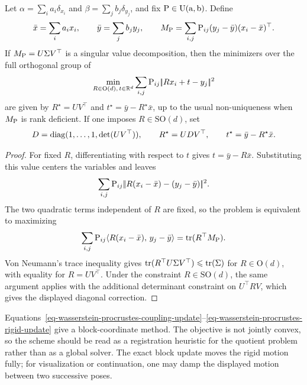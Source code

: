 \begin{prop}\label{prop-wasserstein-procrustes-rigid-update}
	Let $\alpha=\sum_i a_i\delta_{x_i}$ and $\beta=\sum_j b_j\delta_{y_j}$, and fix $\P\in\CouplingsD(\a,\b)$. Define
	\[
		\bar x=\sum_i a_i x_i,\qquad
		\bar y=\sum_j b_j y_j,\qquad
		M_\P=\sum_{i,j} \P_{ij}(y_j-\bar y)(x_i-\bar x)^\top .
	\]
	If $M_\P=U\Sigma V^\top$ is a singular value decomposition, then the minimizers over the full orthogonal group of
	\[
		\min_{R\in\mathrm O(d),\,t\in\RR^d}
		\sum_{i,j}\P_{ij}\norm{Rx_i+t-y_j}^2
	\]
	are given by $R^\star=UV^\top$ and $t^\star=\bar y-R^\star\bar x$, up to the usual non-uniqueness when $M_\P$ is rank deficient. If one imposes $R\in\mathrm{SO}(d)$, set
	\[
		D=\diag(1,\ldots,1,\det(UV^\top)),
		\qquad
		R^\star=UDV^\top,
		\qquad
		t^\star=\bar y-R^\star\bar x .
	\]
\end{prop}

\begin{proof}
	For fixed $R$, differentiating with respect to $t$ gives $t=\bar y-R\bar x$. Substituting this value centers the variables and leaves
	\[
		\sum_{i,j}\P_{ij}\norm{R(x_i-\bar x)-(y_j-\bar y)}^2.
	\]
	The two quadratic terms independent of $R$ are fixed, so the problem is equivalent to maximizing
	\[
		\sum_{i,j}\P_{ij}\dotp{R(x_i-\bar x)}{y_j-\bar y}
		=
		\tr(R^\top M_\P).
	\]
	Von Neumann's trace inequality gives $\tr(R^\top U\Sigma V^\top)\leq\tr(\Sigma)$ for $R\in\mathrm O(d)$, with equality for $R=UV^\top$. Under the constraint $R\in\mathrm{SO}(d)$, the same argument applies with the additional determinant constraint on $U^\top R V$, which gives the displayed diagonal correction.
	\end{proof}

Equations~\eqref{eq-wasserstein-procrustes-coupling-update}--\eqref{eq-wasserstein-procrustes-rigid-update} give a block-coordinate method. The objective is not jointly convex, so the scheme should be read as a registration heuristic for the quotient problem rather than as a global solver. The exact block update moves the rigid motion fully; for visualization or continuation, one may damp the displayed motion between two successive poses.

